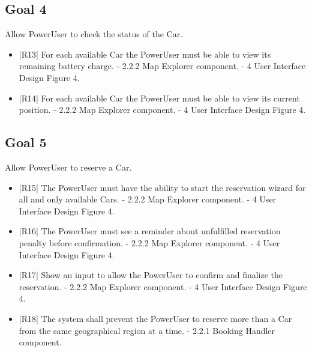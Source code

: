 \subsection {Goal 4} Allow PowerUser to check the status of the Car.
\begin{itemize}
 \item |R13| For each available Car the PowerUser must be able to view its remaining
battery charge.
    \newline - 2.2.2 Map Explorer component.
    \newline - 4 User Interface Design Figure 4.
 \item |R14| For each available Car the PowerUser must be able to view its current position.
    \newline - 2.2.2 Map Explorer component.
    \newline - 4 User Interface Design Figure 4.
\end{itemize}

\subsection {Goal 5} Allow PowerUser to reserve a Car.
\begin{itemize}
 \item |R15| The PowerUser must have the ability to start the reservation wizard for all
and only available Cars.
    \newline - 2.2.2 Map Explorer component.
    \newline - 4 User Interface Design Figure 4.
 \item |R16| The PowerUser must see a reminder about unfulfilled reservation penalty before
confirmation.
    \newline - 2.2.2 Map Explorer component.
    \newline - 4 User Interface Design Figure 4.
 \item |R17| Show an input to allow the PowerUser to confirm and finalize the reservation.
    \newline - 2.2.2 Map Explorer component.
    \newline - 4 User Interface Design Figure 4.
 \item |R18| The system shall prevent the PowerUser to reserve more than a Car from the
same geographical region at a time.
    \newline - 2.2.1 Booking Handler component.
\end{itemize}

